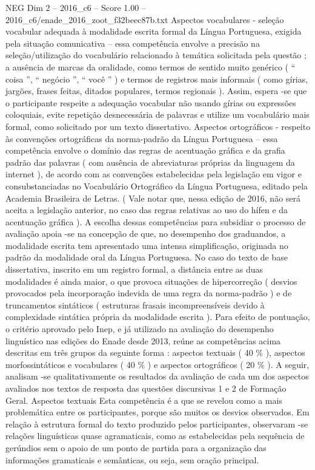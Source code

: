 \begin{textsample}{NEG Dim 2 – 2016\_c6 – Score 1.00 – 2016\_c6/enade\_2016\_zoot\_f32beec87b.txt}
Aspectos vocabulares - seleção vocabular adequada à modalidade escrita formal da Língua Portuguesa, exigida pela situação comunicativa – essa competência envolve a precisão na seleção/utilização do vocabulário relacionado à temática solicitada pela questão ; a ausência de marcas da oralidade, como termos de sentido muito genérico ( “ coisa ”, “ negócio ”, “ você ” ) e termos de registros mais informais ( como gírias, jargões, frases feitas, ditados populares, termos regionais ).
Assim, espera -se que o participante respeite a adequação vocabular não usando gírias ou expressões coloquiais, evite repetição desnecessária de palavras e utilize um vocabulário mais formal, como solicitado por um texto dissertativo.
Aspectos ortográficos - respeito às convenções ortográficas da norma-padrão da Língua Portuguesa – essa competência envolve o domínio das regras de acentuação gráfica e da grafia padrão das palavras ( com ausência de abreviaturas próprias da linguagem da internet ), de acordo com as convenções estabelecidas pela legislação em vigor e consubstanciadas no Vocabulário Ortográfico da Língua Portuguesa, editado pela Academia Brasileira de Letras. ( Vale notar que, nessa edição de 2016, não será aceita a legislação anterior, no caso das regras relativas ao uso do hífen e da acentuação gráfica ).
A escolha dessas competências para subsidiar o processo de avaliação apoia -se na concepção de que, no desempenho dos graduandos, a modalidade escrita tem apresentado uma intensa simplificação, originada no padrão da modalidade oral da Língua Portuguesa.
No caso do texto de base dissertativa, inscrito em um registro formal, a distância entre as duas modalidades é ainda maior, o que provoca situações de hipercorreção ( desvios provocados pela incorporação indevida de uma regra da norma-padrão ) e de truncamentos sintáticos ( estruturas frasais incompreensíveis devido à complexidade sintática própria da modalidade escrita ).
Para efeito de pontuação, o critério aprovado pelo Inep, e já utilizado na avaliação do desempenho linguístico nas edições do Enade desde 2013, reúne as competências acima descritas em três grupos da seguinte forma : aspectos textuais ( 40 \% ), aspectos morfossintáticos e vocabulares ( 40 \% ) e aspectos ortográficos ( 20 \% ).
A seguir, analisam -se qualitativamente os resultados da avaliação de cada um dos aspectos avaliados nos textos de resposta das questões discursivas 1 e 2 de Formação Geral.
Aspectos textuais Esta competência é a que se revelou como a mais problemática entre os participantes, porque são muitos os desvios observados.
Em relação à estrutura formal do texto produzido pelos participantes, observaram -se relações linguísticas quase agramaticais, como as estabelecidas pela sequência de gerúndios sem o apoio de um ponto de partida para a organização das informações gramaticais e semânticas, ou seja, sem oração principal.

\end{textsample}
